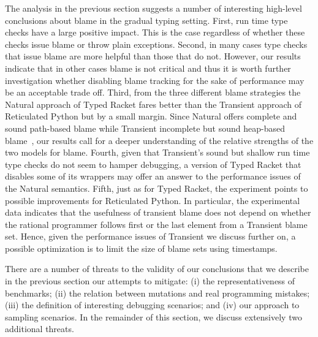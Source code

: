 



The analysis in the previous section suggests a number of interesting
high-level conclusions about blame in the gradual typing setting.  First,
run time type checks have a large positive impact. This is the case
regardless of whether these checks issue blame or throw plain exceptions.
Second, in many cases type checks that issue blame are more helpful than
those that do not. However, our results indicate that in other cases blame
is not critical and thus it is worth further investigation whether
disabling blame tracking for the sake of performance may be   an
acceptable trade off. Third, from the three different blame strategies the
Natural approach of Typed Racket fares better than the Transient approach
of Reticulated Python but by a small margin. Since Natural offers complete
and sound path-based blame while Transient incomplete but sound heap-based
blame~\cite{gfd-oopsla-2019}, our results call for a deeper understanding
of the relative strengths of the two models for blame.  Fourth, given that
Transient's sound but shallow run time type checks do not seem to hamper
debugging, a version of Typed Racket that disables some of its wrappers
may offer an answer to the performance issues of the Natural semantics. 
Fifth, just as for Typed Racket, the experiment points to possible
improvements for Reticulated Python. In particular, the experimental 
data indicates that the usefulness of transient blame does not depend on
whether  the rational programmer follows first or the last element from a
Transient blame set. Hence, given the performance issues of Transient we discuss further on, 
a possible optimization is to limit the size of blame sets
using timestamps.

There are a number of threats to the validity of our conclusions that we
describe in the previous section our attempts to mitigate: (i) the
representativeness of benchmarks; (ii) the relation between mutations and
real programming mistakes; (iii) the definition of interesting debugging
scenarios; and (iv) our approach to sampling scenarios. In the remainder
of this section, we discuss extensively two additional threats.


